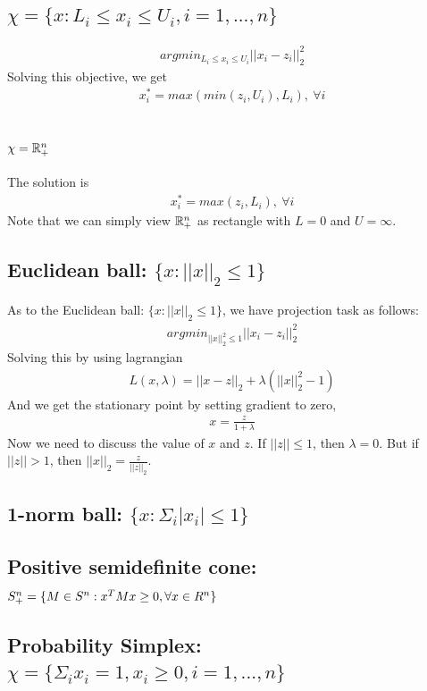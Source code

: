 \documentclass[11pt,a4paper]{article}
\begin{document}
\subsection{$\chi = \{x: L_i \leq x_i \leq U_i, i = 1, ..., n\}$}
\begin{align}
    argmin_{L_i \leq x_i \leq U_i} || x_i - z_i ||_2^2
\end{align}
Solving this objective, we get 
\begin{align}
x_i^{*} = max( min(z_i, U_i), L_i),\ \forall i
\end{align}
\subsection{$\chi = \mathbb{R}_+^n$}
The solution is 
\begin{align}
x_i^{*} = max(z_i, L_i),\ \forall i
\end{align}
Note that we can simply view $\mathbb{R}_+^n$ as rectangle with $L = 0$ and $U =
\infty$.
\subsection{Euclidean ball: $\{x: || x ||_2 \leq 1 \}$}
As to the Euclidean ball: $\{x: || x ||_2 \leq 1 \}$, we have projection task
as follows:
\begin{align}
    argmin_{|| x ||_2^2 \leq 1 } || x_i - z_i ||_2^2
\end{align}
Solving this by using lagrangian
\begin{align}
    L(x, \lambda) = || x - z ||_2 + \lambda (|| x ||_2^2 - 1)
\end{align}
And we get the stationary point by setting gradient to zero,
\begin{align}
    x = \frac{z}{1+\lambda}
\end{align}
Now we need to discuss the value of $x$ and $z$. If $|| z || \leq 1$, then
$\lambda = 0$. But if $|| z || > 1$, then $|| x ||_2 = \frac{z}{||z||_2}$.

\subsection{1-norm ball: $\{x: \Sigma_i | x_i | \leq 1 \}$}

\subsection{Positive semidefinite cone: $S_+^n = \{ M \in S^n: x^T M x \geq 0,
        \forall x \in R^n \}$ }
\subsection{Probability Simplex: $\chi = \{\Sigma_i x_i = 1, x_i \geq 0, i =
        1, ..., n \}$}
\end{document}
